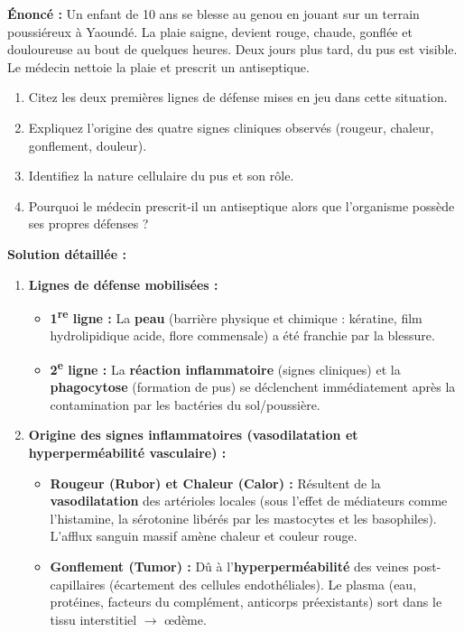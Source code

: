 \documentclass[11pt]{article}
\begin{document}
\begin{exoresolu}
\textbf{Énoncé :} Un enfant de 10 ans se blesse au genou en jouant sur un terrain poussiéreux à Yaoundé. La plaie saigne, devient rouge, chaude, gonflée et douloureuse au bout de quelques heures. Deux jours plus tard, du pus est visible. Le médecin nettoie la plaie et prescrit un antiseptique.
\begin{enumerate}
 \item Citez les deux premières lignes de défense mises en jeu dans cette situation.
 \item Expliquez l'origine des quatre signes cliniques observés (rougeur, chaleur, gonflement, douleur).
 \item Identifiez la nature cellulaire du pus et son rôle.
 \item Pourquoi le médecin prescrit-il un antiseptique alors que l'organisme possède ses propres défenses ?
\end{enumerate}
\tcblower
\textbf{Solution détaillée :}
\begin{enumerate}
 \item \textbf{Lignes de défense mobilisées :}
 \begin{itemize}
 \item \textbf{1\textsuperscript{re} ligne :} La \textbf{peau} (barrière physique et chimique : kératine, film hydrolipidique acide, flore commensale) a été franchie par la blessure.
 \item \textbf{2\textsuperscript{e} ligne :} La \textbf{réaction inflammatoire} (signes cliniques) et la \textbf{phagocytose} (formation de pus) se déclenchent immédiatement après la contamination par les bactéries du sol/poussière.
 \end{itemize}
 \item \textbf{Origine des signes inflammatoires (vasodilatation et hyperperméabilité vasculaire) :}
 \begin{itemize}
 \item \textbf{Rougeur (Rubor) et Chaleur (Calor) :} Résultent de la \textbf{vasodilatation} des artérioles locales (sous l'effet de médiateurs comme l'histamine, la sérotonine libérés par les mastocytes et les basophiles). L'afflux sanguin massif amène chaleur et couleur rouge.
 \item \textbf{Gonflement (Tumor) :} Dû à l'\textbf{hyperperméabilité} des veines post-capillaires (écartement des cellules endothéliales). Le plasma (eau, protéines, facteurs du complément, anticorps préexistants) sort dans le tissu interstitiel $\rightarrow$ œdème.

\end{itemize}
\end{enumerate}
\end{exoresolu}
\end{document}
